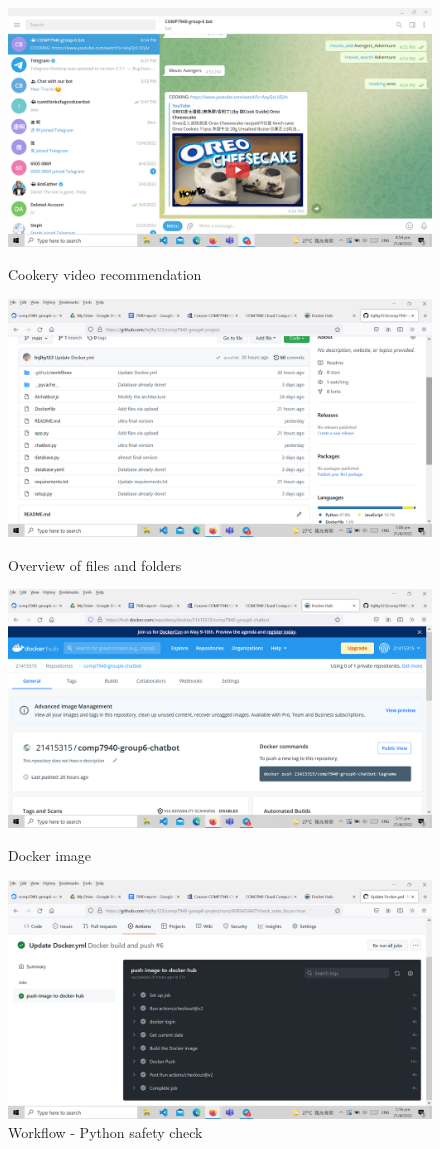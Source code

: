 \documentclass[conference]{IEEEtran}
\begin{document}
\begin{figure}[h]
\includegraphics[scale=0.155]{10} 
\caption{Cookery video recommendation}
\includegraphics[scale=0.155]{11} 
\caption{Overview of files and folders}
\includegraphics[scale=0.155]{12} 
\caption{Docker image}
\includegraphics[scale=0.155]{13} 
\caption{Workflow - Python safety check}
\end{figure}
\vspace{12pt}
\color{red}
\end{document}
